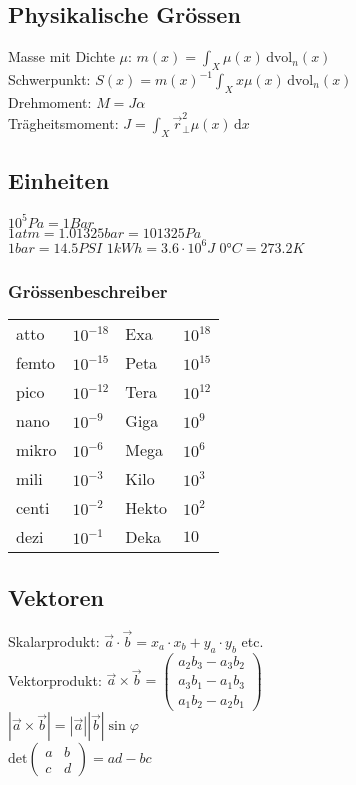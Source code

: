     \subsection{Physikalische Grössen}
        Masse mit Dichte $\mu$: $m(x) = \int_{X} \mu (x) \, \mathrm{dvol}_n(x)$ \\
        Schwerpunkt: $S(x) = m(x)^{-1} \int_{X} x\mu(x) \, \mathrm{dvol}_n (x)$ \\
        Drehmoment: $M= J\alpha$ \\
        Trägheitsmoment: $J = \int_{X} \vec{r}^2_{\bot} \mu(x) \, \mathrm{d} x$
    \subsection{Einheiten}
        $10^5 Pa = 1 Bar$ \\
        $1atm = 1.01325 bar = 101325 Pa$ \\
        $1 bar = 14.5 PSI$
        $1 kWh = 3.6\cdot 10^6J$
        $0° C = 273.2 K$
        \subsubsection{Grössenbeschreiber}
            \begin{tabular}{l l | l l}
                atto & $10^{-18}$ & Exa & $10^{18}$ \\
                femto & $10^{-15}$ & Peta & $10^{15}$ \\
                pico & $10^{-12}$ & Tera & $10^{12}$ \\
                nano & $10^{-9}$ & Giga & $10^9$ \\
                mikro & $10^{-6}$ & Mega & $10^6$ \\
                mili & $10^{-3}$ & Kilo & $10^3$ \\
                centi & $10^{-2}$ & Hekto & $10^2$ \\
                dezi & $10^{-1}$ & Deka & $10$ \\
            \end{tabular}
    \subsection{Vektoren}
        Skalarprodukt: $\vec{a}\cdot\vec{b}=x_a\cdot x_b+y_a\cdot y_b$ etc. \\
        Vektorprodukt: $\vec{a}\times\vec{b}= \begin{pmatrix}
            a_2b_3 - a_3b_2 \\
            a_3b_1 - a_1b_3 \\
            a_1b_2 - a_2b_1
        \end{pmatrix}$ \\
        $|\vec{a} \times \vec{b}| = |\vec{a}||\vec{b}|\sin{\varphi}$ \\
        $\mathrm{det}\begin{pmatrix}
            a & b \\
            c & d
        \end{pmatrix} = ad - bc$
